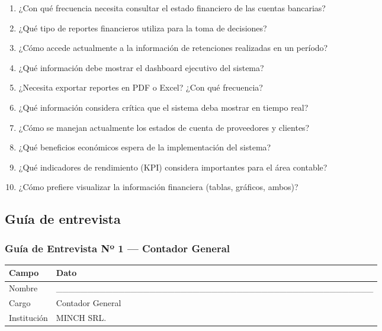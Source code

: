 \documentclass[stu]{apa7}
\begin{document}
\begin{enumerate}
    \item ¿Con qué frecuencia necesita consultar el estado financiero de las cuentas bancarias?
    \item ¿Qué tipo de reportes financieros utiliza para la toma de decisiones?
    \item ¿Cómo accede actualmente a la información de retenciones realizadas en un período?
    \item ¿Qué información debe mostrar el dashboard ejecutivo del sistema?
    \item ¿Necesita exportar reportes en PDF o Excel? ¿Con qué frecuencia?
    \item ¿Qué información considera crítica que el sistema deba mostrar en tiempo real?
    \item ¿Cómo se manejan actualmente los estados de cuenta de proveedores y clientes?
    \item ¿Qué beneficios económicos espera de la implementación del sistema?
    \item ¿Qué indicadores de rendimiento (KPI) considera importantes para el área contable?
    \item ¿Cómo prefiere visualizar la información financiera (tablas, gráficos, ambos)?
\end{enumerate}

\newpage

\subsection{Guía de entrevista}

\subsubsection{Guía de Entrevista Nº 1 --- Contador General}

\begin{tabularx}{\textwidth}{|l|X|}
\hline
\rowcolor[gray]{0.9}
\textbf{Campo} & \textbf{Dato} \\
\hline
Nombre & \_\_\_\_\_\_\_\_\_\_\_\_\_\_\_\_\_\_\_\_\_\_\_\_\_\_\_\_\_\_\_\_\_\_\_\_\_\_\_\_\_\_\_\_\_\_\_\_\_\_\_ \\
\hline
Cargo & Contador General \\
\hline
Institución & MINCH SRL. \\
\hline
\end{tabularx}

\vspace{0.3cm}
\end{document}
